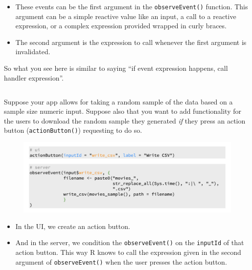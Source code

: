 \documentclass[
  letterpaper,
  DIV=11,
  numbers=noendperiod]{scrreprt}
\providecommand{\tightlist}{%
  \setlength{\itemsep}{0pt}\setlength{\parskip}{0pt}}
\begin{document}
\begin{itemize}
\item
  These events can be the first argument in the \texttt{observeEvent()}
  function. This argument can be a simple reactive value like an input,
  a call to a reactive expression, or a complex expression provided
  wrapped in curly braces.
\item
  The second argument is the expression to call whenever the first
  argument is invalidated.
\end{itemize}

So what you see here is similar to saying ``if event expression happens,
call handler expression''.

\hypertarget{section-50}{%
\subsection{}\label{section-50}}

Suppose your app allows for taking a random sample of the data based on
a sample size numeric input. Suppose also that you want to add
functionality for the users to download the random sample they generated
\emph{if} they press an action button (\texttt{actionButton()})
requesting to do so.

\begin{figure}

{\centering \includegraphics[width=1\textwidth,height=\textheight]{./images/actionButton.png}

}

\end{figure}

\begin{itemize}
\tightlist
\item
  In the UI, we create an action button.
\item
  And in the server, we condition the \texttt{observeEvent()} on the
  \texttt{inputId} of that action button. This way R knows to call the
  expression given in the second argument of \texttt{observeEvent()}
  when the user presses the action button.
\end{itemize}
\end{document}
